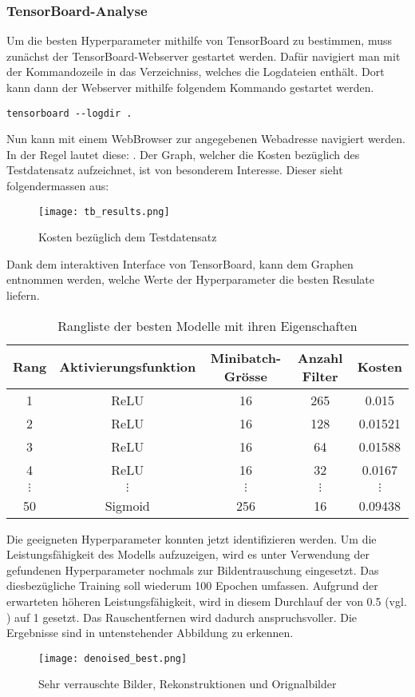 \subsubsection{TensorBoard-Analyse}
Um die besten Hyperparameter mithilfe von TensorBoard zu bestimmen, muss
zunächst der TensorBoard-Webserver gestartet werden. Dafür navigiert man
mit der Kommandozeile in das Verzeichniss, welches die Logdateien enthält.
Dort kann dann der Webserver mithilfe folgendem Kommando gestartet werden.
\begin{verbatim}
tensorboard --logdir .
\end{verbatim}
Nun kann mit einem WebBrowser zur angegebenen Webadresse navigiert werden. In
der Regel lautet diese: .
Der Graph, welcher die Kosten bezüglich des Testdatensatz aufzeichnet, ist von besonderem
Interesse. Dieser sieht folgendermassen aus:
\para{}
\begin{figure}[h!]
  \centering
  \texttt{[image: tb\_results.png]}
  \caption{Kosten bezüglich dem Testdatensatz}
\end{figure}
\para{}
Dank dem interaktiven Interface von TensorBoard, kann dem Graphen entnommen
werden, welche Werte der Hyperparameter die besten Resulate liefern.

\para{}
\begin{table}[h!]
  \centering
  \begin{tabular}{ |c|c|c|c|c| }
    \hline
    Rang & Aktivierungsfunktion & Minibatch-Grösse & Anzahl Filter & Kosten \\
    \hline
    1 & ReLU & 16 & 265 & 0.015 \\
    2 & ReLU & 16 & 128 & 0.01521 \\
    3 & ReLU & 16 & 64 & 0.01588 \\
    4 & ReLU & 16 & 32 & 0.0167 \\
    $\vdots$ & $\vdots$ & $\vdots$ & $\vdots$ & $\vdots$ \\
    50 & Sigmoid & 256 & 16 & 0.09438 \\
    \hline
  \end{tabular}
  \caption{Rangliste der besten Modelle mit ihren Eigenschaften}
  \label{tab:rangliste}
\end{table}
\para{}
Die geeigneten Hyperparameter konnten jetzt identifizieren werden. Um die
Leistungsfähigkeit des Modells aufzuzeigen, wird es unter Verwendung
der gefundenen Hyperparameter nochmals zur Bildentrauschung eingesetzt.
Das diesbezügliche Training soll wiederum 100 Epochen umfassen.
Aufgrund der erwarteten höheren Leistungsfähigkeit, wird in diesem Durchlauf der
 von 0.5 (vgl. ) auf
1 gesetzt. Das Rauschentfernen wird dadurch anspruchsvoller. Die Ergebnisse sind
in untenstehender Abbildung zu erkennen.
\begin{figure}[h!]
  \centering
  \texttt{[image: denoised\_best.png]}
  \caption{Sehr verrauschte Bilder, Rekonstruktionen und Orignalbilder}
\end{figure}


